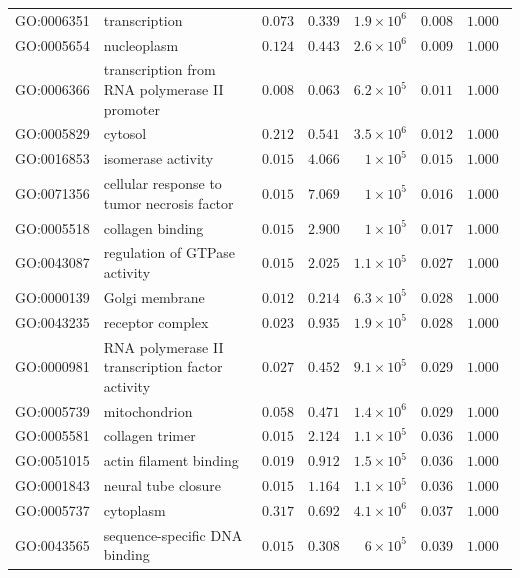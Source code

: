 \documentclass{article}
\begin{document}
\begin{center}
\begin{longtable*}{|l|l|r|r|r|r|r|}
            GO:0006351 & transcription & $ 0.073$ & $ 0.339$ & $1.9\times 10^{6}$ & $ 0.008$ & $ 1.000~~$ \\
            GO:0005654 & nucleoplasm & $ 0.124$ & $ 0.443$ & $2.6\times 10^{6}$ & $ 0.009$ & $ 1.000~~$ \\
            GO:0006366 & transcription from RNA polymerase II promoter & $ 0.008$ & $ 0.063$ & $6.2\times 10^{5}$ & $ 0.011$ & $ 1.000~~$ \\
            GO:0005829 & cytosol & $ 0.212$ & $ 0.541$ & $3.5\times 10^{6}$ & $ 0.012$ & $ 1.000~~$ \\
            GO:0016853 & isomerase activity & $ 0.015$ & $ 4.066$ & $ 1\times 10^{5}$ & $ 0.015$ & $ 1.000~~$ \\
            GO:0071356 & cellular response to tumor necrosis factor & $ 0.015$ & $ 7.069$ & $ 1\times 10^{5}$ & $ 0.016$ & $ 1.000~~$ \\
            GO:0005518 & collagen binding & $ 0.015$ & $ 2.900$ & $ 1\times 10^{5}$ & $ 0.017$ & $ 1.000~~$ \\
            GO:0043087 & regulation of GTPase activity & $ 0.015$ & $ 2.025$ & $1.1\times 10^{5}$ & $ 0.027$ & $ 1.000~~$ \\
            GO:0000139 & Golgi membrane & $ 0.012$ & $ 0.214$ & $6.3\times 10^{5}$ & $ 0.028$ & $ 1.000~~$ \\
            GO:0043235 & receptor complex & $ 0.023$ & $ 0.935$ & $1.9\times 10^{5}$ & $ 0.028$ & $ 1.000~~$ \\
            GO:0000981 & RNA polymerase II transcription factor activity & $ 0.027$ & $ 0.452$ & $9.1\times 10^{5}$ & $ 0.029$ & $ 1.000~~$ \\
            GO:0005739 & mitochondrion & $ 0.058$ & $ 0.471$ & $1.4\times 10^{6}$ & $ 0.029$ & $ 1.000~~$ \\
            GO:0005581 & collagen trimer & $ 0.015$ & $ 2.124$ & $1.1\times 10^{5}$ & $ 0.036$ & $ 1.000~~$ \\
            GO:0051015 & actin filament binding & $ 0.019$ & $ 0.912$ & $1.5\times 10^{5}$ & $ 0.036$ & $ 1.000~~$ \\
            GO:0001843 & neural tube closure & $ 0.015$ & $ 1.164$ & $1.1\times 10^{5}$ & $ 0.036$ & $ 1.000~~$ \\
            GO:0005737 & cytoplasm & $ 0.317$ & $ 0.692$ & $4.1\times 10^{6}$ & $ 0.037$ & $ 1.000~~$ \\
            GO:0043565 & sequence-specific DNA binding & $ 0.015$ & $ 0.308$ & $ 6\times 10^{5}$ & $ 0.039$ & $ 1.000~~$ \\

\end{longtable*}
\end{center}
\end{document}
